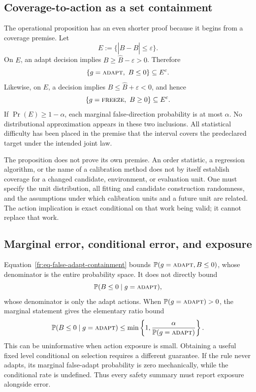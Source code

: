 \subsection{Coverage-to-action as a set containment}
\label{fr:subsec-coverage-containment}

The operational proposition has an even shorter proof because it begins from a coverage premise.
Let
\begin{equation}
  E:=\{|\widehat B-B|\le\varepsilon\}.
  \label{fr:eq-coverage-event}
\end{equation}
On $E$, an adapt decision implies
$B\ge\widehat B-\varepsilon>0$.  Therefore
\begin{equation}
  \{g=\textnormal{\textsc{adapt}},\ B\le0\}\subseteq E^c.
  \label{fr:eq-false-adapt-containment}
\end{equation}
Likewise, on $E$, a \freeze decision implies
$B\le\widehat B+\varepsilon<0$, and hence
\begin{equation}
  \{g=\textnormal{\textsc{freeze}},\ B\ge0\}\subseteq E^c.
  \label{fr:eq-false-freeze-containment}
\end{equation}
If $\Pr(E)\ge1-\alpha$, each marginal false-direction probability is at most $\alpha$.  No
distributional approximation appears in these two inclusions.  All statistical difficulty has
been placed in the premise that the interval covers the predeclared target under the intended joint
law.

The proposition does not prove its own premise.  An order statistic, a regression algorithm, or the
name of a calibration method does not by itself establish coverage for a changed candidate,
environment, or evaluation unit.  One must specify the unit distribution, all fitting and candidate
construction randomness, and the assumptions under which calibration units and a future unit are
related.  The action implication is exact conditional on that work being valid; it cannot replace
that work.

\subsection{Marginal error, conditional error, and exposure}
\label{fr:subsec-error-denominators}

Equation~\eqref{fr:eq-false-adapt-containment} bounds
$\mathbb{P}(g=\textnormal{\textsc{adapt}},B\le0)$, whose denominator is the entire probability space.  It does not directly
bound
\begin{equation}
  \mathbb{P}(B\le0\mid g=\textnormal{\textsc{adapt}}),
  \label{fr:eq-conditional-false-adapt}
\end{equation}
whose denominator is only the adapt actions.  When $\mathbb{P}(g=\textnormal{\textsc{adapt}})>0$, the marginal statement gives
the elementary ratio bound
\begin{equation}
  \mathbb{P}(B\le0\mid g=\textnormal{\textsc{adapt}})
  \le \min\left\{1,\frac{\alpha}{\mathbb{P}(g=\textnormal{\textsc{adapt}})}\right\}.
  \label{fr:eq-exposure-ratio}
\end{equation}
This can be uninformative when action exposure is small.  Obtaining a useful fixed level conditional
on selection requires a different guarantee.  If the rule never adapts, its marginal false-adapt
probability is zero mechanically, while the conditional rate is undefined.  Thus every safety
summary must report exposure alongside error.

